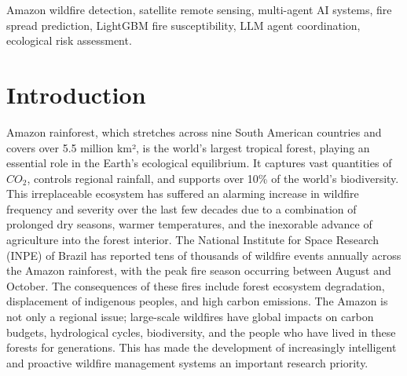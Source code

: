 \documentclass{ieeeaccess}
\begin{document}
\begin{keywords}
Amazon wildfire detection, satellite remote sensing, multi-agent AI systems, fire spread prediction, LightGBM fire susceptibility, LLM agent coordination, ecological risk assessment.
\end{keywords}

\titlepgskip=-21pt

\maketitle
\section{Introduction}
\label{sec:introduction}

 Amazon rainforest, which stretches across nine South American countries and covers over 5.5 million km², is the world's largest tropical forest, playing an essential role in the Earth's ecological equilibrium. It captures vast quantities of $CO_2$, controls regional rainfall, and supports over 10\% of the world's biodiversity. This irreplaceable ecosystem has suffered an alarming increase in wildfire frequency and severity over the last few decades due to a combination of prolonged dry seasons, warmer temperatures, and the inexorable advance of agriculture into the forest interior. The National Institute for Space Research (INPE) of Brazil has reported tens of thousands of wildfire events annually across the Amazon rainforest, with the peak fire season occurring between August and October. The consequences of these fires include forest ecosystem degradation, displacement of indigenous peoples, and high carbon emissions. The Amazon is not only a regional issue; large-scale wildfires have global impacts on carbon budgets, hydrological cycles, biodiversity, and the people who have lived in these forests for generations. This has made the development of increasingly intelligent and proactive wildfire management systems an important research priority.
\end{document}
